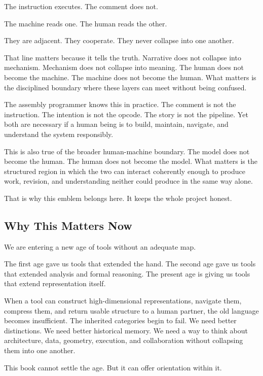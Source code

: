 \documentclass[
]{article}
\begin{document}
The instruction executes. The comment does not.

The machine reads one. The human reads the other.

They are adjacent. They cooperate. They never collapse into one another.

That line matters because it tells the truth. Narrative does not
collapse into mechanism. Mechanism does not collapse into meaning. The
human does not become the machine. The machine does not become the
human. What matters is the disciplined boundary where these layers can
meet without being confused.

The assembly programmer knows this in practice. The comment is not the
instruction. The intention is not the opcode. The story is not the
pipeline. Yet both are necessary if a human being is to build, maintain,
navigate, and understand the system responsibly.

This is also true of the broader human-machine boundary. The model does
not become the human. The human does not become the model. What matters
is the structured region in which the two can interact coherently enough
to produce work, revision, and understanding neither could produce in
the same way alone.

That is why this emblem belongs here. It keeps the whole project honest.

\hypertarget{why-this-matters-now}{%
\subsection{Why This Matters Now}\label{why-this-matters-now}}

We are entering a new age of tools without an adequate map.

The first age gave us tools that extended the hand. The second age gave
us tools that extended analysis and formal reasoning. The present age is
giving us tools that extend representation itself.

When a tool can construct high-dimensional representations, navigate
them, compress them, and return usable structure to a human partner, the
old language becomes insufficient. The inherited categories begin to
fail. We need better distinctions. We need better historical memory. We
need a way to think about architecture, data, geometry, execution, and
collaboration without collapsing them into one another.

This book cannot settle the age. But it can offer orientation within it.
\end{document}
